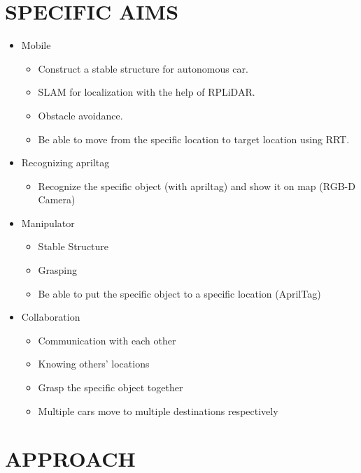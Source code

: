 \documentclass[a4paper, 10pt, conference]{ieeeconf}      %
\begin{document}
\section{SPECIFIC AIMS}
\begin{itemize}
\item Mobile
\begin{itemize}
	\item Construct a stable structure for autonomous car.
	\item SLAM for localization with the help of RPLiDAR.
	\item Obstacle avoidance.
	\item Be able to move from the specific location to target location using RRT.
\end{itemize}

\item Recognizing apriltag
\begin{itemize}
    \item Recognize the specific object (with apriltag) and show it on map (RGB-D Camera)
\end{itemize}

\item Manipulator
\begin{itemize}
	\item Stable Structure
	\item Grasping
	\item Be able to put the specific object to a specific location (AprilTag)
\end{itemize}

\item Collaboration
\begin{itemize}
	\item Communication with each other
	\item Knowing others’ locations
	\item Grasp the specific object together
	\item Multiple cars move to multiple destinations respectively
\end{itemize}
\end{itemize}

\section{APPROACH}
\end{document}
